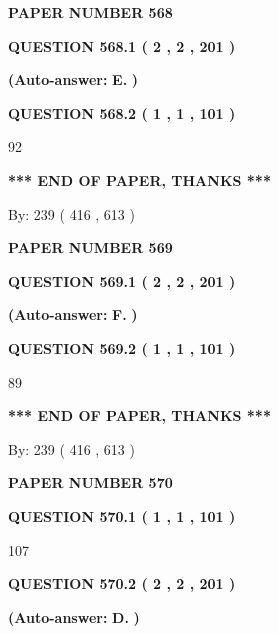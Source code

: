\documentclass{ctexart}
\begin{document}
   
 {\textbf{ \Large{ PAPER NUMBER  568  }}}
   
   
   
   
  
  
{\textbf{\large{QUESTION
568.1 
 ( 2 , 2 , 201 )
}}}
 
 
{\textbf{(Auto-answer:}}
{\textbf{\large{
E.}}}
{\textbf{)}}
 
 
  
  
{\textbf{\large{QUESTION
568.2 
 ( 1 , 1 , 101 )
}}}

92
   
   
   
   
\vspace{1.0in} 
{\textbf{\large{ *** END OF PAPER, THANKS *** }}} 
   
   
\hspace{1.0in} By: 
 239 ( 416 ,  613 )
   
   
   
   
\newpage 
\setcounter{page}{ 
   569001 } 
   
   
 {\textbf{ \Large{ PAPER NUMBER  569  }}}
   
   
   
   
  
  
{\textbf{\large{QUESTION
569.1 
 ( 2 , 2 , 201 )
}}}
 
 
{\textbf{(Auto-answer:}}
{\textbf{\large{
F.}}}
{\textbf{)}}
 
 
  
  
{\textbf{\large{QUESTION
569.2 
 ( 1 , 1 , 101 )
}}}

89
   
   
   
   
\vspace{1.0in} 
{\textbf{\large{ *** END OF PAPER, THANKS *** }}} 
   
   
\hspace{1.0in} By: 
 239 ( 416 ,  613 )
   
   
   
   
\newpage 
\setcounter{page}{ 
   570001 } 
   
   
 {\textbf{ \Large{ PAPER NUMBER  570  }}}
   
   
   
   
  
  
{\textbf{\large{QUESTION
570.1 
 ( 1 , 1 , 101 )
}}}

107
  
  
{\textbf{\large{QUESTION
570.2 
 ( 2 , 2 , 201 )
}}}
 
 
{\textbf{(Auto-answer:}}
{\textbf{\large{
D.}}}
{\textbf{)}}
 
\end{document}
